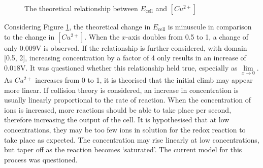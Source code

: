 \documentclass[10.5pt,a4paper]{article}
\begin{document}
\begin{figure}

	\centering 

	

 
		\caption{The theoretical relationship between $E_{\textrm{cell}}$ and $[Cu^{2+}]$}
		\label{ogLog}
\end{figure}
\newpage
Considering Figure \ref{ogLog}, the theoretical change in $E_\textrm{cell}$ is minuscule in comparison to the change in $[Cu^{2+}]$. When the $x$-axis doubles from 0.5 to 1, a change of only $0.009$V is observed. If the relationship is further considered, with domain [0.5, 2], increasing concentration by a factor of 4 only results in an increase of $0.018$V. 
It was questioned whether this relationship held true, especially as $\lim\limits_{x\to 0}$.
As $Cu^{2+}$ increases from 0 to 1, it is theorised that the initial climb may appear more linear. If collision theory is considered, an increase in concentration is usually linearly proportional to the rate of reaction. When the concentration of ions is increased, more reactions should be able to take place per second, therefore increasing the output of the cell. It is hypothesised that at low concentrations, they may be too few ions in solution for the redox reaction to take place as expected. The concentration may rise linearly at low concentrations, but taper off as the reaction becomes `saturated'. The current model for this process was questioned.
\end{document}
